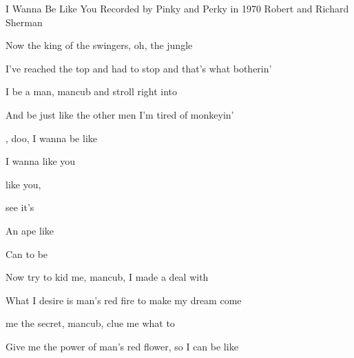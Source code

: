 \begin{SBSong}{I Wanna Be Like You}
  {Recorded by Pinky and Perky in 1970}
  {Robert and Richard Sherman}
  \begin{SBVerse}
	Now  the king of the swingers, oh, the jungle 

	I've reached the top and had to stop and that's what botherin' 
	
	I  be a man, mancub and stroll right into 

	And be just like the other men I'm tired of monkeyin' 
  \end{SBVerse}
  \begin{SBChorus}
	,  doo, I wanna be like 

	I wanna  like you

	 like you, 

	 see it's 

	An ape like 

	Can  to be  
  \end{SBChorus}
  \begin{SBVerse}
	Now  try to kid me, mancub, I made a deal with 

	What I desire is man's red fire to make my dream come 

	 me the secret, mancub, clue me what to 

	Give me the power of man's red flower, so I can be like 
  \end{SBVerse}  
\end{SBSong}
